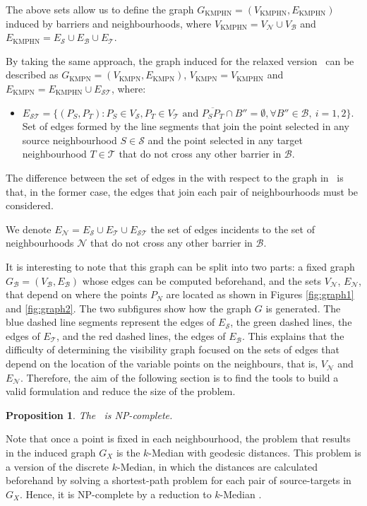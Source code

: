\documentclass[a4paper,  review, authoryear, 1p.]{elsarticle}
\newcommand{\KMPHN}{{\sf{H-KMPHN}}}
\newcommand{\KMPN}{{\sf{H-KMPN}\xspace }}
\newcommand{\B}{{\mathcal B}}
\newcommand{\VB}{{V^{}_{\mathcal B}}}
\newcommand{\EB}{{E^{}_{\mathcal B}}}
\newcommand{\VS}{{V^{}_{\mathcal S}}}
\newcommand{\ES}{{E^{}_{\mathcal S}}}
\newcommand{\VT}{{V^{}_{\mathcal T}}}
\newcommand{\ET}{{E^{}_{\mathcal T}}}
\newcommand{\VN}{{V^{}_{\mathcal N}}}
\newcommand{\EN}{{E^{}_{\mathcal N}}}
\newcommand{\EST}{{E^{}_{\mathcal S\mathcal T}}}
\newcommand{\GKMPHN}{{G_{\text{KMPHN}}}}
\newcommand{\VKMPHN}{{V_{\text{KMPHN}}}}
\newcommand{\EKMPHN}{{E_{\text{KMPHN}}}}
\newcommand{\GKMPN}{{G_{\text{KMPN}}}}
\newcommand{\VKMPN}{{V_{\text{KMPN}}}}
\newcommand{\EKMPN}{{E_{\text{KMPN}}}}
\newtheorem{prop}{Proposition}
\newcommand{\JP}[1]{{\color{blue}#1}}
\newcommand{\CV}[1]{{\color{blue}#1}}
\begin{document}
	The above sets allow us to define the graph $\GKMPHN= (\VKMPHN, \EKMPHN)$ induced by barriers and neighbourhoods, where $\VKMPHN=\VN\cup\VB$ and $\EKMPHN=\ES\cup\EB\cup\ET$. 
	
	By taking the same approach, the graph induced for the relaxed version \KMPN \ can be described as $\GKMPN= (\VKMPN, \EKMPN)$, $\VKMPN= \VKMPHN$ and $\EKMPN=\EKMPHN\cup \EST$, where:
	\begin{itemize}
		\item $\EST=\{(P_S, P_T):P_S\in\VS, P_T\in\VT \text{ and } \overline{P_SP_T}\cap B''=\emptyset,\forall B''\in\B,\:i=1,2\}$. Set of edges formed by the line segments that join the point selected in any source neighbourhood $S\in \mathcal{S}$ and the point selected in any target neighbourhood $T\in \mathcal{T}$ \CV{that do not cross any other barrier in $\B$.}
	\end{itemize}
	
	\CV{The difference between the set of edges in the \KMPHN \xspace with respect to the graph in \KMPN \ is that, in the former case, the edges that join each pair of neighbourhoods must be considered.}
	
	\CV{We denote $\EN=\ES\cup\ET\cup\EST$ the set of edges incidents to the set of neighbourhoods $\mathcal N$ that do not cross any other barrier in $\B$.}
	
	\JP{It is interesting to note that this graph can be split into two parts: a fixed graph $G_\B=(\VB,\EB)$ whose edges can be computed beforehand, and the sets $\VN$, $\EN$, that depend on where the points $P_N$ are located as shown in Figures \ref{fig:graph1} and \ref{fig:graph2}.  The two subfigures show how the graph $G$ is generated. The blue dashed line segments represent the edges of $\ES$, the green dashed lines, the edges of $\ET$, and the red dashed lines, the edges of $\EB$. This explains that the difficulty of determining the visibility graph focused on the sets of edges that depend on the location of the variable points on the neighbours, that is, $\VN$ and $\EN$. Therefore, the aim of the following section is to find the tools to build a valid formulation and reduce the size of the problem.}

	
	
	\CV{
		\begin{prop}
			The \KMPN \ is NP-complete.
		\end{prop}
		
	Note that once a point is fixed in each neighbourhood, the problem that results in the induced graph $G_X$ is the $k$-Median with geodesic distances. This problem is a version of the discrete $k$-Median, in which the distances are calculated beforehand by solving a shortest-path problem for each pair of source-targets in $G_X$. Hence, it is NP-complete by a reduction to $k$-Median \citep{kariv1979}.}
	
\end{document}
